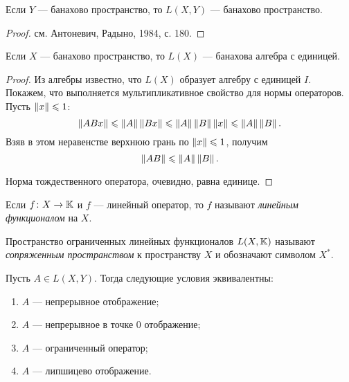 \begin{theorem}
    Если $Y$ --- банахово пространство, то $L(X, Y)$ --- банахово
    пространство.
\end{theorem}

\begin{proof}
   см. Антоневич, Радыно, 1984, с. 180. 
\end{proof}

\begin{corollaryth}
   Если $X$ --- банахово пространство, то $L(X)$ --- банахова алгебра с единицей.
\end{corollaryth}

\begin{proof}
    Из алгебры известно, что $L(X)$ образует алгебру с единицей $I$. Покажем, что выполняется
    мультипликативное свойство для нормы операторов. Пусть $\left\|x\right\| \leqslant 1$:
    \[ \left\|ABx\right\| \leqslant \left\|A\right\|\left\|Bx\right\| \leqslant \left\|A\right\|\left\|B\right\|\left\|x\right\| \leqslant \left\|A\right\|\left\|B\right\|. \]
    Взяв в этом неравенстве верхнюю грань по $\left\|x\right\| \leqslant 1$, получим
    \[ \left\|AB\right\| \leqslant \left\|A\right\|\left\|B\right\|. \]

    Норма тождественного оператора, очевидно, равна единице.
\end{proof}

\begin{definition}
    Если $f \colon X \to \mathbb{K}$ и $f$ --- линейный оператор,
     то $f$ называют \emph{линейным функционалом} на $X$.

    Пространство ограниченных линейных функционалов $L(X, \mathbb{K})$ называют
    \emph{сопряженным пространством} к пространству $X$ и обозначают символом $X^*$.
\end{definition}

\begin{theorem}
    Пусть $A \in L(X, Y)$. Тогда следующие условия эквивалентны:
    \begin{enumerate}
        \item $A$ --- непрерывное отображение;
        \item $A$ --- непрерывное в точке $0$ отображение;
        \item $A$ --- ограниченный оператор;
        \item $A$ --- липшицево отображение.
    \end{enumerate}
\end{theorem}

